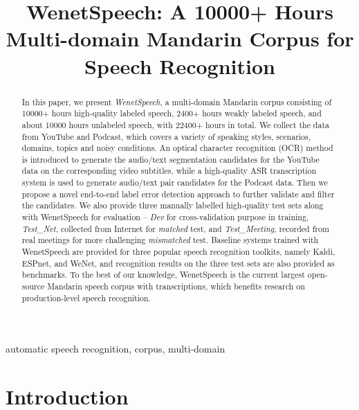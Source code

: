 \documentclass{article}
\title{WenetSpeech: A 10000+ Hours Multi-domain Mandarin Corpus for Speech Recognition}
\begin{document}
\maketitle
\ninept
\begin{abstract}
In this paper, we present \textit{WenetSpeech}, a multi-domain Mandarin corpus consisting of 10000+ hours high-quality labeled speech, 2400+ hours weakly labeled speech, and about 10000 hours unlabeled speech, with 22400+ hours in total.
We collect the data from YouTube and Podcast, which covers a variety of speaking styles, scenarios, domains, topics and noisy conditions.
An optical character recognition (OCR) method is introduced to generate the audio/text segmentation candidates for the YouTube data on the corresponding video subtitles, while a high-quality ASR transcription system is used to generate audio/text pair candidates for the Podcast data.
Then we propose a novel end-to-end label error detection approach to further validate and filter the candidates.
We also provide three manually labelled high-quality test sets along with WenetSpeech for evaluation -- \textit{Dev} for cross-validation purpose in training, \textit{Test\_Net}, collected from Internet for \textit{matched} test, and \textit{Test\_Meeting}, recorded from real meetings for more challenging \textit{mismatched} test.
Baseline systems trained with WenetSpeech are provided for three popular speech recognition toolkits, namely Kaldi, ESPnet, and WeNet, and recognition results on the three test sets are also provided as benchmarks. To the best of our knowledge, WenetSpeech is the current largest open-source Mandarin speech corpus with transcriptions, which benefits research on production-level speech recognition.

\end{abstract}
\begin{keywords}
automatic speech recognition, corpus, multi-domain
\end{keywords}
\vspace{-1.5em}
\section{Introduction}
\vspace{-1em}
\end{document}
